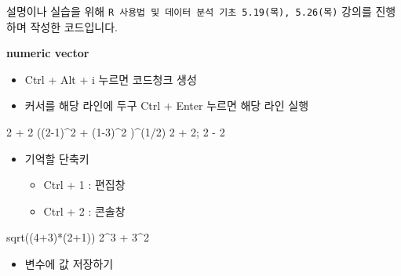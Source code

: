 \documentclass[
]{book}
\newenvironment{Shaded}{\begin{snugshade}}{\end{snugshade}}
\newcommand{\DecValTok}[1]{\textcolor[rgb]{0.00,0.00,0.81}{#1}}
\newcommand{\FunctionTok}[1]{\textcolor[rgb]{0.00,0.00,0.00}{#1}}
\newcommand{\NormalTok}[1]{#1}
\newcommand{\SpecialCharTok}[1]{\textcolor[rgb]{0.00,0.00,0.00}{#1}}
\providecommand{\tightlist}{%
  \setlength{\itemsep}{0pt}\setlength{\parskip}{0pt}}
\begin{document}
설명이나 실습을 위해 \texttt{R\ 사용법\ 및\ 데이터\ 분석\ 기초\ 5.19(목),\ 5.26(목)} 강의를 진행하며 작성한 코드입니다.

\textbf{numeric vector}

\begin{itemize}
\tightlist
\item
  Ctrl + Alt + i 누르면 코드청크 생성
\item
  커서를 해당 라인에 두구 Ctrl + Enter 누르면 해당 라인 실행
\end{itemize}

\begin{Shaded}
\begin{Highlighting}[]
\DecValTok{2} \SpecialCharTok{+} \DecValTok{2}
\NormalTok{((}\DecValTok{2{-}1}\NormalTok{)}\SpecialCharTok{\^{}}\DecValTok{2} \SpecialCharTok{+}\NormalTok{ (}\DecValTok{1{-}3}\NormalTok{)}\SpecialCharTok{\^{}}\DecValTok{2}\NormalTok{ )}\SpecialCharTok{\^{}}\NormalTok{(}\DecValTok{1}\SpecialCharTok{/}\DecValTok{2}\NormalTok{)}
\DecValTok{2} \SpecialCharTok{+} \DecValTok{2}\NormalTok{; }\DecValTok{2} \SpecialCharTok{{-}} \DecValTok{2}
\end{Highlighting}
\end{Shaded}

\begin{itemize}
\tightlist
\item
  기억할 단축키

  \begin{itemize}
  \tightlist
  \item
    Ctrl + 1 : 편집창
  \item
    Ctrl + 2 : 콘솔창
  \end{itemize}
\end{itemize}

\begin{Shaded}
\begin{Highlighting}[]
\FunctionTok{sqrt}\NormalTok{((}\DecValTok{4}\SpecialCharTok{+}\DecValTok{3}\NormalTok{)}\SpecialCharTok{*}\NormalTok{(}\DecValTok{2}\SpecialCharTok{+}\DecValTok{1}\NormalTok{))}
\DecValTok{2}\SpecialCharTok{\^{}}\DecValTok{3} \SpecialCharTok{+} \DecValTok{3}\SpecialCharTok{\^{}}\DecValTok{2}
\end{Highlighting}
\end{Shaded}

\begin{itemize}
\tightlist
\item
  변수에 값 저장하기
\end{itemize}
\end{document}
